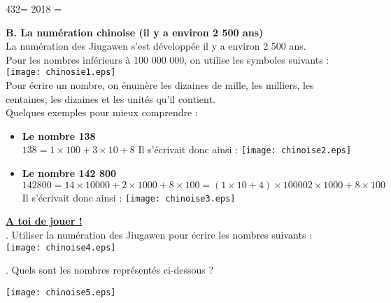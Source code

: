 \documentclass[a4paper,11pt]{article}
\newcounter{enumtabi}
\newcommand{\q}{\stepcounter{enumtabi} \theenumtabi.  }
\newcommand{\initq}{\setcounter{enumtabi}{0}}
\newcommand{\bi}{\begin{itemize}}
\newcommand{\ei}{\end{itemize}}
\begin{document}
432= \hspace*{8cm}  2018 = \\

\newpage

\vspace*{0.3cm}

\textbf{{\large B. La numération chinoise  (il y a environ 2 500 ans)}}\\


La numération des Jiugawen s'est développée il y a environ 2 500 ans.\\

Pour les nombres inférieurs à 100 000 000, on utilise les symboles suivants :\\

\texttt{[image: chinosie1.eps]} \\

Pour écrire un nombre, on énumère les dizaines de mille, les milliers, les centaines, les dizaines et les unités qu'il contient.\\

Quelques exemples pour mieux comprendre :\\


\bi

\item \textbf{ Le nombre 138}\\

$138 = 1 \times 100 + 3 \times 10 + 8$ \hspace*{0.3cm} Il s'écrivait donc ainsi : \texttt{[image: chinoise2.eps]}\\



\item \textbf{Le nombre 142 800}\\

$142 800 = 14 \times 10 000 + 2 \times 1 000 + 8 \times 100 = (1 \times 10 + 4) \times 10 000 2 \times 1 000 + 8 \times 100 $ \\

Il s'écrivait donc ainsi : \hspace*{0.3cm} \texttt{[image: chinoise3.eps]}\\


\ei


\textbf{\underline{A toi de jouer !}}\\


\initq \q Utiliser la numération des Jiugawen pour écrire les nombres suivants :\\

\texttt{[image: chinoise4.eps]}\\

\vspace*{0.5cm}


\q Quels sont les nombres représentés ci-dessous ?\\
\vspace*{0.2cm}

\texttt{[image: chinoise5.eps]}\\
\end{document}
